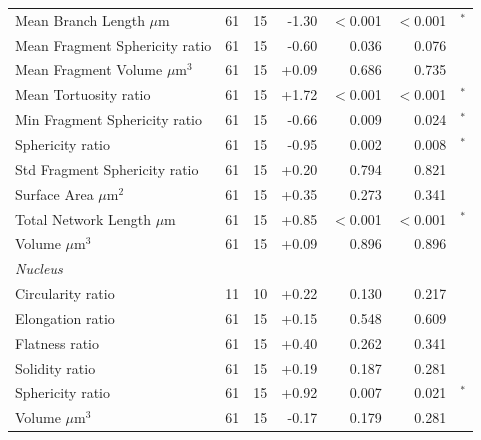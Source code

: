 \documentclass[11pt,a4paper]{article}
\begin{document}
\begin{longtable}{lrrrrrr}
  Mean Branch Length $\mu$m & 61 & 15 & -1.30 & $<$0.001 & $<$0.001 & $^{*}$ \\
  Mean Fragment Sphericity ratio & 61 & 15 & -0.60 & 0.036 & 0.076 &  \\
  Mean Fragment Volume $\mu$m$^{3}$ & 61 & 15 & +0.09 & 0.686 & 0.735 &  \\
  Mean Tortuosity ratio & 61 & 15 & +1.72 & $<$0.001 & $<$0.001 & $^{*}$ \\
  Min Fragment Sphericity ratio & 61 & 15 & -0.66 & 0.009 & 0.024 & $^{*}$ \\
  Sphericity ratio & 61 & 15 & -0.95 & 0.002 & 0.008 & $^{*}$ \\
  Std Fragment Sphericity ratio & 61 & 15 & +0.20 & 0.794 & 0.821 &  \\
  Surface Area $\mu$m$^{2}$ & 61 & 15 & +0.35 & 0.273 & 0.341 &  \\
  Total Network Length $\mu$m & 61 & 15 & +0.85 & $<$0.001 & $<$0.001 & $^{*}$ \\
  Volume $\mu$m$^{3}$ & 61 & 15 & +0.09 & 0.896 & 0.896 &  \\
\midrule
\multicolumn{7}{l}{\textit{Nucleus}} \\
  Circularity ratio & 11 & 10 & +0.22 & 0.130 & 0.217 &  \\
  Elongation ratio & 61 & 15 & +0.15 & 0.548 & 0.609 &  \\
  Flatness ratio & 61 & 15 & +0.40 & 0.262 & 0.341 &  \\
  Solidity ratio & 61 & 15 & +0.19 & 0.187 & 0.281 &  \\
  Sphericity ratio & 61 & 15 & +0.92 & 0.007 & 0.021 & $^{*}$ \\
  Volume $\mu$m$^{3}$ & 61 & 15 & -0.17 & 0.179 & 0.281 &  \\
\bottomrule
\end{longtable}
\end{document}
